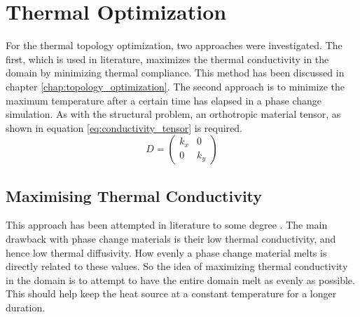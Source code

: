 \section{Thermal Optimization}
For the thermal topology optimization, two approaches were investigated. The first, which is used in literature, maximizes the thermal conductivity in the domain by minimizing thermal compliance. This method has been discussed in chapter \ref{chap:topology_optimization}. The second approach is to minimize the maximum temperature after a certain time has elapsed in a phase change simulation. As with the structural problem, an orthotropic material tensor, as shown in equation \ref{eq:conductivity_tensor} is required. 
\begin{equation}
  D = \begin{pmatrix}
    k_x & 0 \\ 0 & k_y
  \end{pmatrix}
  \label{eq:conductivity_tensor}
\end{equation}  

\subsection*{Maximising Thermal Conductivity}
This approach has been attempted in literature to some degree \cite{Vargas_Huitink_Iradukunda_Eddy_2020}. The main drawback with phase change materials is their low thermal conductivity, and hence low thermal diffusivity. How evenly a phase change material melts is directly related to these values. So the idea of maximizing thermal conductivity in the domain is to attempt to have the entire domain melt as evenly as possible. This should help keep the heat source at a constant temperature for a longer duration.

